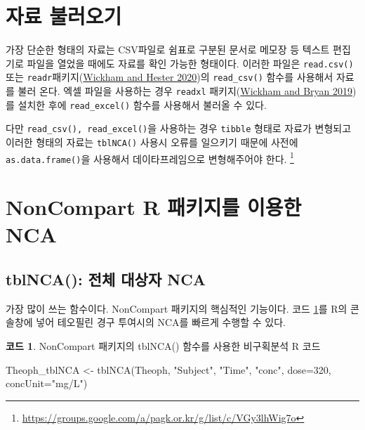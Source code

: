 \documentclass[
  11pt,
  krantz2, a4paper, twoside]{krantz}
\newenvironment{Shaded}{\begin{snugshade}}{\end{snugshade}}
\newcommand{\AttributeTok}[1]{\textcolor[rgb]{0.77,0.63,0.00}{#1}}
\newcommand{\DecValTok}[1]{\textcolor[rgb]{0.00,0.00,0.81}{#1}}
\newcommand{\FunctionTok}[1]{\textcolor[rgb]{0.00,0.00,0.00}{#1}}
\newcommand{\NormalTok}[1]{#1}
\newcommand{\OtherTok}[1]{\textcolor[rgb]{0.56,0.35,0.01}{#1}}
\newcommand{\StringTok}[1]{\textcolor[rgb]{0.31,0.60,0.02}{#1}}
\theoremstyle{definition}
\theoremstyle{definition}
\newtheorem{example}{코드}[chapter]
\theoremstyle{definition}
\theoremstyle{definition}
\theoremstyle{remark}
\begin{document}
\hypertarget{loading}{%
\section{자료 불러오기}\label{loading}}

가장 단순한 형태의 자료는 CSV파일로 쉼표로 구분된 문서로 메모장 등 텍스트 편집기로 파일을 열었을 때에도 자료를 확인 가능한 형태이다.
이러한 파일은 \texttt{read.csv()} 또는 \texttt{readr}패키지(\protect\hyperlink{ref-R-readr}{Wickham and Hester 2020})의 \texttt{read\_csv()} 함수를 사용해서 자료를 불러 온다.
엑셀 파일을 사용하는 경우 \texttt{readxl} 패키지(\protect\hyperlink{ref-R-readxl}{Wickham and Bryan 2019})를 설치한 후에 \texttt{read\_excel()} 함수를 사용해서 불러올 수 있다.

다만 \texttt{read\_csv(),\ read\_excel()}을 사용하는 경우 \texttt{tibble} 형태로 자료가 변형되고 이러한 형태의 자료는 \texttt{tblNCA()} 사용시 오류를 일으키기 때문에 사전에 \texttt{as.data.frame()}을 사용해서 데이타프레임으로 변형해주어야 한다. \footnote{\url{https://groups.google.com/a/pagk.or.kr/g/list/c/VGy3lhWig7o}}

\hypertarget{noncompart-r-uxd328uxd0a4uxc9c0uxb97c-uxc774uxc6a9uxd55c-nca}{%
\section{NonCompart R 패키지를 이용한 NCA}\label{noncompart-r-uxd328uxd0a4uxc9c0uxb97c-uxc774uxc6a9uxd55c-nca}}

\hypertarget{tblNCA}{%
\subsection{tblNCA(): 전체 대상자 NCA}\label{tblNCA}}

가장 많이 쓰는 함수이다.
NonCompart 패키지의 핵심적인 기능이다.
코드 \ref{exm:tblnca-code}를 R의 콘솔창에 넣어 테오필린 경구 투여시의 NCA를 빠르게 수행할 수 있다.

\begin{example}
\protect\hypertarget{exm:tblnca-code}{}\label{exm:tblnca-code}NonCompart 패키지의 tblNCA() 함수를 사용한 비구획분석 R 코드
\end{example}

\vspace{-5ex}

\begin{Shaded}
\begin{Highlighting}[]
\NormalTok{Theoph\_tblNCA }\OtherTok{\textless{}{-}} \FunctionTok{tblNCA}\NormalTok{(Theoph, }\StringTok{"Subject"}\NormalTok{, }\StringTok{"Time"}\NormalTok{, }\StringTok{"conc"}\NormalTok{, }
                        \AttributeTok{dose=}\DecValTok{320}\NormalTok{, }\AttributeTok{concUnit=}\StringTok{"mg/L"}\NormalTok{)}
\end{Highlighting}
\end{Shaded}
\end{document}
